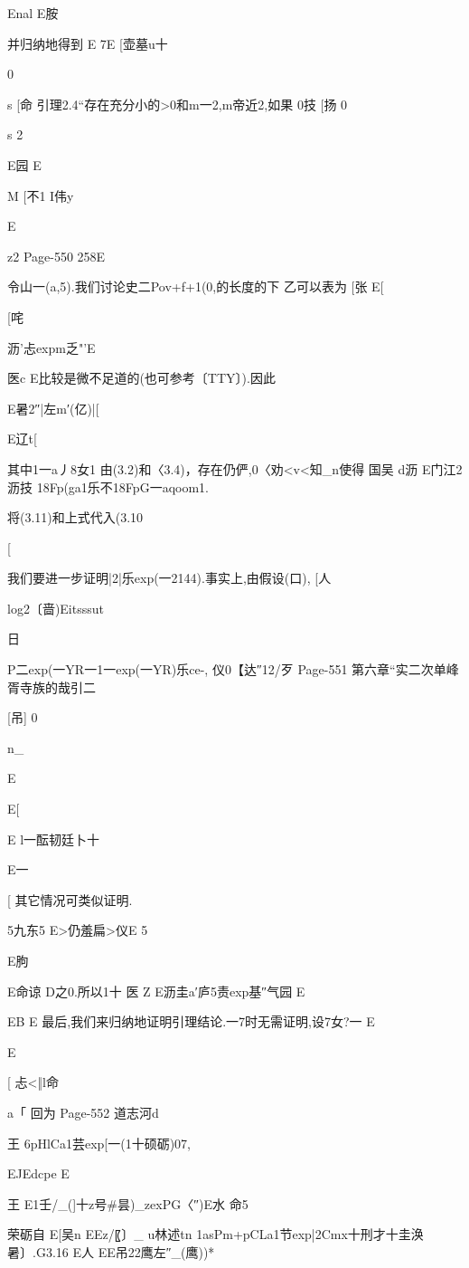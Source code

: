 {{Enal
E胺

并归纳地得到
E
7E
[壶墓u十

0

s
[命
引理2.4“存在充分小的>0和m一2,m帝近2,如果
0技
[扬
0

s
2

E园
E

M
[不1
I伟y

E

z2
Page-550
258E

令山一(a,5).我们讨论史二Pov+f+1(0,的长度的下
乙可以表为
[张
E[

[咤

沥'忐expm乏"'E

医c
E比较是微不足道的(也可参考〔TTY〕).因此

E暑2″|左m′(亿)|[

E辽t[

其中1一a丿8女1
由(3.2)和〈3.4)，存在仍俨,0〈劝<v<知_n使得
国吴
d沥
E门江2沥技
18Fp(ga1乐不18FpG一aqoom1.

将(3.11)和上式代入(3.10

[

我们要进一步证明|2|乐exp(一2144).事实上,由假设(口),
[人

log2〔啬)Eitsssut

日

P二exp(一YR一1一exp(一YR)乐ce-,
仪0【达″12/歹
Page-551
第六章“实二次单峰胥寺族的哉引二

[吊]
0

n_

E

E[

E
l一酝韧廷卜十

E一

[
其它情况可类似证明.

5九东5
E>仍羞扁>仪E
5

E朐

E命谅
D之0.所以1十
医
Z
E沥圭a′庐5责exp基″气园
E

EB
E
最后,我们来归纳地证明引理结论.一7时无需证明,设7女?一
E

E

[
忐<‖l命

a「
回为
Page-552
道志河d

王
6pHlCa1芸exp[一(1十硕砺)07,

EJEdcpe
E

王
E1壬/_(]十z号#昙)_zexPG〈″)E水
命5

荣砺自
E[吴n
EEz/〖〕_
u林述tn
1asPm+pCLa1节exp|2Cmx十刑才十圭涣暑〕.G3.16
E人
EE吊22鹰左″_(鹰))*

}}
